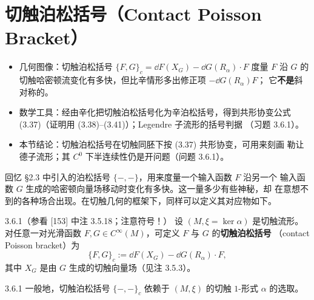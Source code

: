 \section{切触泊松括号（Contact Poisson Bracket）}

\begin{keytakeaways}
\begin{itemize}
  \item 几何图像：切触泊松括号
        $\{F,G\}_{c}=\dd F(X_G)-\dd G(R_\alpha)\cdot F$ 度量 $F$ 沿 $G$ 的
        切触哈密顿流变化有多快，但比辛情形多出修正项 $-\dd G(R_\alpha)F$；
        它\textbf{不是}斜对称的。
  \item 数学工具：经由辛化把切触泊松括号化为辛泊松括号，得到共形协变公式
        (3.37)（证明用 (3.38)–(3.41)）；Legendre 子流形的括号判据
        （习题 3.6.1）。
  \item 本节结论：切触泊松括号在切触同胚下按 (3.37) 共形协变，可用来刻画
        勒让德子流形；其 $C^0$ 下半连续性仍是开问题（问题 3.6.1）。
\end{itemize}
\end{keytakeaways}

回忆 §2.3 中引入的泊松括号 $\{-,-\}$，用来度量一个输入函数 $F$ 沿另一个
输入函数 $G$ 生成的哈密顿向量场移动时变化有多快。这一量多少有些神秘，却
在意想不到的各种场合出现。在切触几何的框架下，同样可以定义其对应物如下。

\begin{wdefn}{3.6.1}（参看 [153] 中注 3.5.18；注意符号！）
设 $(M,\xi=\ker\alpha)$ 是切触流形。对任意一对光滑函数
$F,G\in C^\infty(M)$，可定义 $F$ 与 $G$ 的\textbf{切触泊松括号}
（contact Poisson bracket）为
\[
  \{F,G\}_{c}:=\dd F(X_G)-\dd G(R_\alpha)\cdot F,
\]
其中 $X_G$ 是由 $G$ 生成的切触向量场（见注 3.5.3）。
\end{wdefn}

\begin{wrem}{3.6.1}
一般地，切触泊松括号 $\{-,-\}_{c}$ 依赖于 $(M,\xi)$ 的切触 $1$-形式
$\alpha$ 的选取。
\end{wrem}


